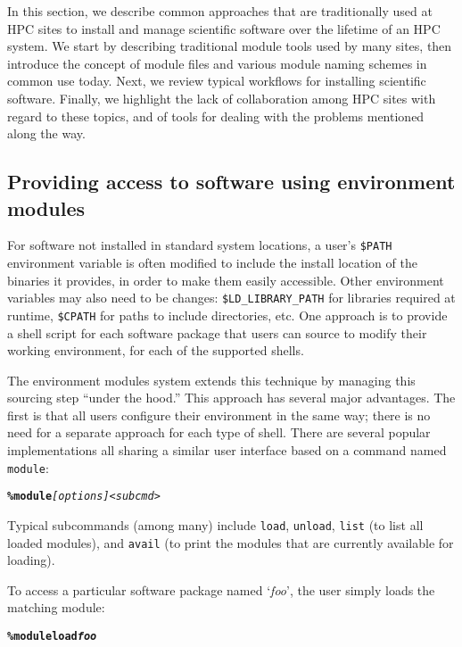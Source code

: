 In this section, we describe common approaches that are traditionally used at HPC
sites to install and manage scientific software over the lifetime of an HPC system.
We start by describing traditional module tools used by many sites, then introduce
the concept of module files and various module naming schemes in common use today.
Next, we review typical workflows for installing scientific software. Finally,
we highlight the lack of collaboration among HPC sites with regard to these topics,
and of tools for dealing with the problems mentioned along the way.

\subsection{Providing access to software using environment modules}
\label{sec:env_modules_system}

For software not installed in standard system locations, a user's
\texttt{\small\$PATH} environment variable is often modified to include the install
location of the binaries it provides, in order to make them easily accessible.
Other environment variables may also need to be changes: 
\texttt{\small\$LD\_LIBRARY\_PATH} for libraries required at runtime,
\texttt{\small\$CPATH} for paths to include directories, etc.
One approach is to provide a shell script for each software package that
users can source to modify their working environment, for each of the supported
shells.

The environment modules system extends this technique by managing this sourcing step ``under the hood.'' This approach has several major
advantages. The first is that all users configure their environment in the same way; there is no need for a
separate approach for each type of shell. There are several popular implementations
all sharing a similar
user interface based on a command named \texttt{\small module}:
{\small
\begin{alltt}
    \textbf{\% module} \emph{[options]} \emph{<subcmd>}\
\end{alltt}
}
\noindent
Typical subcommands (among many) include \texttt{\small load},
\texttt{\small unload}, \texttt{\small list} (to list all loaded
modules), and \texttt{\small avail} (to print the modules that are currently available for loading).

To access a particular software package named `\emph{foo}', the user simply
loads the matching module:
{\small
\begin{alltt}
    \textbf{\% module load \emph{foo}}\
\end{alltt}
}

